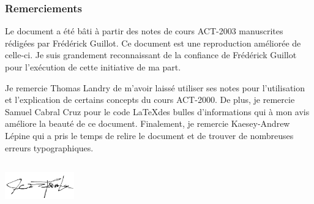 
\subsubsection*{Remerciements}
Le document a été bâti à partir des notes de cours ACT-2003 manuscrites rédigées par Frédérick Guillot. Ce document est une reproduction améliorée de celle-ci. Je suis grandement reconnaissant de la confiance de Frédérick Guillot pour l'exécution de cette initiative de ma part. 
\bigskip

Je remercie Thomas Landry de m'avoir laissé utiliser ses notes pour l'utilisation et l'explication de certains concepts du cours ACT-2000. De plus, je remercie Samuel Cabral Cruz pour le code \LaTeX  des bulles d'informations qui à mon avis améliore la beauté de ce document. Finalement, je remercie Kaesey-Andrew Lépine qui a pris le temps de relire le document et de trouver de nombreuses erreurs typographiques.

\bigskip
\includegraphics[height=2cm, width = 3cm]{fig/signature.png}


